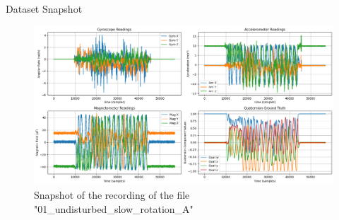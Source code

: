 \documentclass[aspectratio=169,xcolor=dvipsnames]{beamer}
\begin{document}
\begin{frame}{Dataset Snapshot}
\hfill
\begin{figure}
    \centering
    \includegraphics[width=0.8\linewidth]{logos/dataset_snapshot.png}
    \caption{Snapshot of the recording of the file "01\_undisturbed\_slow\_rotation\_A"}
    \label{fig:imuapp}
\end{figure}
\hfill
\end{frame}
\end{document}
